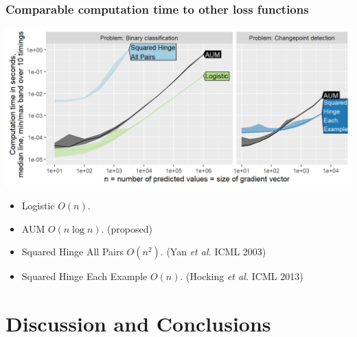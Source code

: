 \documentclass[t]{beamer}
\begin{document}
\begin{frame}
  \frametitle{Comparable computation time to other loss functions}

\includegraphics[width=\textwidth]{figure-aum-grad-speed-both.png}

\begin{itemize}
\item Logistic $O(n)$. 
\item AUM $O(n\log n)$. (proposed)
\item Squared Hinge All Pairs $O(n^2)$. (Yan \emph{et al.} ICML 2003)
\item Squared Hinge Each Example $O(n)$. (Hocking \emph{et al.} ICML 2013)
\end{itemize}
  
\end{frame}

\section{Discussion and Conclusions}
\end{document}
